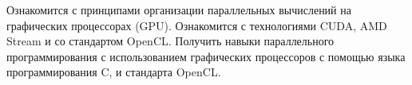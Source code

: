 
Ознакомится с принципами организации параллельных вычислений на графических процессорах (GPU). Ознакомится с технологиями CUDA, AMD Stream и со стандартом OpenCL. Получить навыки параллельного программирования с использованием графических процессоров с помощью языка программирования C, \gl и стандарта OpenCL.

